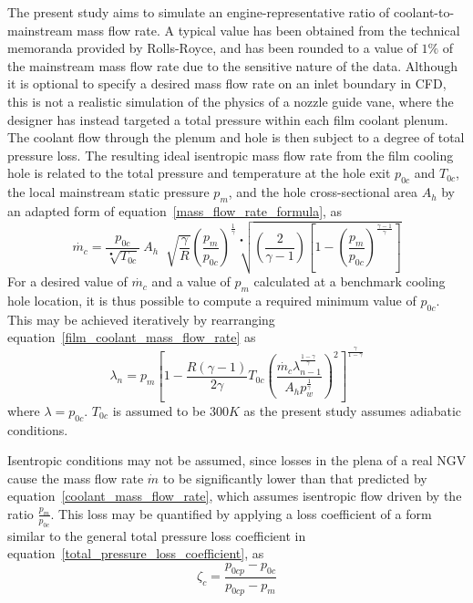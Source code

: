 \documentclass[a4paper, 11pt, oneside]{report}
\begin{document}
The present study aims to simulate an engine-representative ratio of coolant-to-mainstream mass flow rate. A typical value has been obtained from the technical memoranda provided by Rolls-Royce, and has been rounded to a value of $1\%$ of the mainstream mass flow rate due to the sensitive nature of the data. Although it is optional to specify a desired mass flow rate on an inlet boundary in CFD, this is not a realistic simulation of the physics of a nozzle guide vane, where the designer has instead targeted a total pressure within each film coolant plenum. The coolant flow through the plenum and hole is then subject to a degree of total pressure loss. The resulting ideal isentropic mass flow rate from the film cooling hole is related to the total pressure and temperature at the hole exit $p_{0c}$ and $T_{0c}$, the local mainstream static pressure $p_m$, and the hole cross-sectional area $A_h$ by an adapted form of equation~\ref{mass_flow_rate_formula}, as
\begin{equation}\label{film_coolant_mass_flow_rate}
\dot{m_c} =
\frac{p_{0c}}{\sqrt[•]{T_{0c}}} \>
A_h \;
\sqrt[]{\frac{\gamma}{R}}
\left(
    \frac{p_m}{p_{0c}}
\right)^\frac{1}{\gamma}
\sqrt[•]{
	\left(
		\frac{2}{\gamma - 1}  
	\right)
	\left[
		1 - \left( \frac{p_m}{p_{0c}} \right)^\frac{\gamma-1}{\gamma}
	\right] 
}
\end{equation}
For a desired value of $\dot{m_c}$ and a value of $p_m$ calculated at a benchmark cooling hole location, it is thus possible to compute a required minimum value of $p_{0c}$. This may be achieved iteratively by rearranging equation~\ref{film_coolant_mass_flow_rate} as
\begin{equation}\label{coolant_mass_flow_rate}
\lambda_n =
p_m
\left[
	1-
	\frac{
		R\left(\gamma-1\right)
	}{
		2\gamma
	}
	T_{0c}
	\left(
		\frac{
			\dot{m_c}
			\lambda_{n-1}^{\frac{1-\gamma}{\gamma}}
		}{
			A_h
			p_w^{\frac{1}{\gamma}}
		}
	\right)
	^2
\right]
^{\frac{\gamma}{1-\gamma}}
\end{equation}
where $\lambda=p_{0c}$. $T_{0c}$ is assumed to be $300 K$ as the present study assumes adiabatic conditions. 

Isentropic conditions may not be assumed, since losses in the plena of a real NGV cause the mass flow rate $\dot{m}$ to be significantly lower than that predicted by equation~\ref{coolant_mass_flow_rate}, which assumes isentropic flow driven by the ratio $\frac{p_m}{p_{0c}}$. This loss may be quantified by applying a loss coefficient of a form similar to the general total pressure loss coefficient in equation~\ref{total_pressure_loss_coefficient}, as
\begin{equation}\label{film_coolant_loss_coefficient}
\zeta_c = 
\frac{
p_{0cp} - p_{0c}
}{
p_{0cp} - p_m
}
\end{equation}
\end{document}
